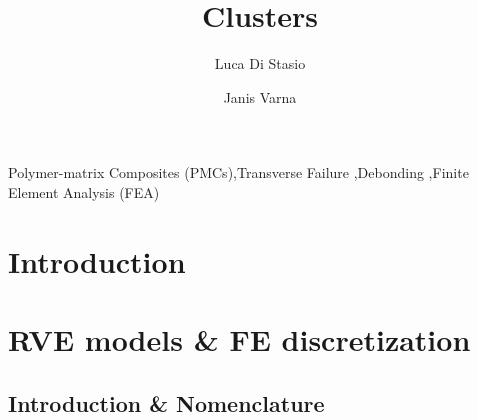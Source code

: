 \documentclass[review]{elsarticle}
\begin{document}
\begin{frontmatter}

\title{Clusters}


\author[lulea]{Luca Di Stasio}
\author[lulea]{Janis Varna}


\address[lulea]{Lule\aa\ University of Technology, University Campus, SE-97187 Lule\aa, Sweden}

\begin{abstract}
\noindent

\end{abstract}

\begin{keyword}
Polymer-matrix Composites (PMCs)\sep Transverse Failure \sep Debonding \sep Finite Element Analysis (FEA)
\end{keyword}


\end{frontmatter}

\linenumbers


\section{Introduction}




\section{RVE models \& FE discretization}

\subsection{Introduction \& Nomenclature}\label{subsec:names}
\end{document}
